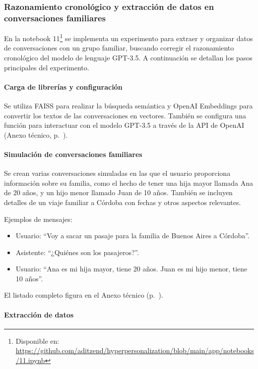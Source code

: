 \subsubsection{Razonamiento cronológico y extracción de datos en conversaciones familiares}

En la notebook 11\footnote{Disponible en: \url{https://github.com/aditzend/hyperpersonalization/blob/main/app/notebooks/11.ipynb}} se implementa un experimento para extraer y organizar datos de conversaciones con un grupo familiar, buscando corregir el razonamiento cronológico del modelo de lenguaje GPT-3.5. A continuación se detallan los pasos principales del experimento.

\paragraph{Carga de librerías y configuración}

Se utiliza FAISS para realizar la búsqueda semántica y OpenAI Embeddings para convertir los textos de las conversaciones en vectores. También se configura una función para interactuar con el modelo GPT-3.5 a través de la API de OpenAI (Anexo técnico, p.~\pageref{anexo:code-4-1-11-1}).

\paragraph{Simulación de conversaciones familiares}

Se crean varias conversaciones simuladas en las que el usuario proporciona información sobre su familia, como el hecho de tener una hija mayor llamada Ana de 20 años, y un hijo menor llamado Juan de 10 años. También se incluyen detalles de un viaje familiar a Córdoba con fechas y otros aspectos relevantes.

Ejemplos de mensajes:
\begin{itemize}
    \item Usuario: ``Voy a sacar un pasaje para la familia de Buenos Aires a Córdoba''.
    \item Asistente: ``¿Quiénes son los pasajeros?''.
    \item Usuario: ``Ana es mi hija mayor, tiene 20 años. Juan es mi hijo menor, tiene 10 años''.
\end{itemize}

El listado completo figura en el Anexo técnico (p.~\pageref{anexo:code-4-1-11-2}).

\paragraph{Extracción de datos}

